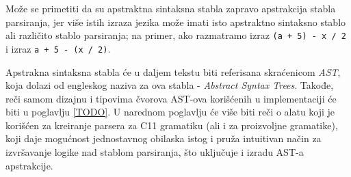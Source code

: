 Može se primetiti da su apstraktna sintaksna stabla 
zapravo apstrakcija stabla parsiranja, jer više istih izraza jezika 
može imati isto apstraktno sintaksno stablo ali različito stablo
parsiranja; na primer, ako razmatramo izraz \texttt{(a + 5) - x / 2} 
i izraz \texttt{a + 5 - (x / 2)}.

Apstrakna sintaksna stabla će u daljem tekstu biti referisana 
skraćenicom \emph{AST}, koja dolazi od engleskog naziva za ova stabla
- \emph{Abstract Syntax Trees}. Takođe, reči samom dizajnu i tipovima 
čvorova AST-ova korišćenih u implementaciji će biti u poglavlju 
\ref{TODO}. U narednom poglavlju će više biti reči o alatu koji je 
korišćen za kreiranje parsera za C11 gramatiku (ali i za proizvoljne
gramatike), koji daje mogućnost jednostavnog obilaska istog i pruža
intuitivan način za izvršavanje logike nad stablom parsiranja, što
uključuje i izradu AST-a apstrakcije.
